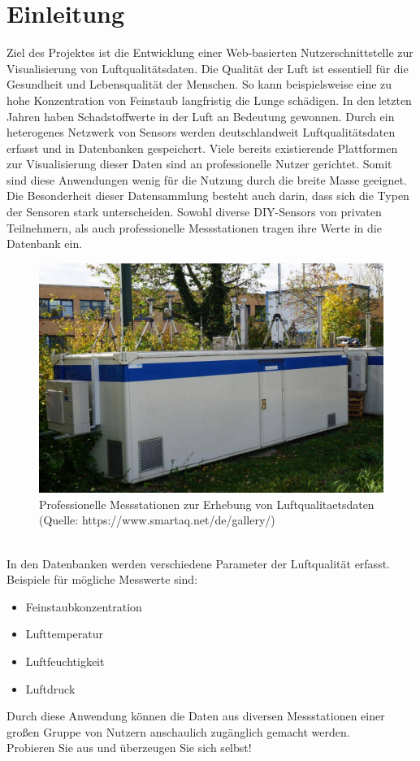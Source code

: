 \section{Einleitung}

Ziel des Projektes ist die Entwicklung einer Web-basierten Nutzerschnittstelle zur Visualisierung von Luftqualitätsdaten.
Die Qualität der Luft ist essentiell für die Gesundheit und Lebensqualität der Menschen. So kann beispielsweise eine zu hohe Konzentration von Feinstaub langfristig die Lunge schädigen. 
In den letzten Jahren haben Schadstoffwerte in der Luft an Bedeutung gewonnen.
Durch ein heterogenes Netzwerk von \glspl{Sensor} werden deutschlandweit Luftqualitätsdaten erfasst und in Datenbanken gespeichert.
Viele bereits existierende Plattformen zur Visualisierung dieser Daten sind an professionelle Nutzer gerichtet. Somit sind diese Anwendungen wenig für die Nutzung durch die breite Masse geeignet.
\\
Die Besonderheit dieser Datensammlung besteht auch darin, dass sich die Typen der Sensoren stark unterscheiden. Sowohl diverse \gls{DIY}-\glspl{Sensor} von privaten Teilnehmern, als auch professionelle Messstationen tragen ihre Werte in die Datenbank ein. 
\\
\begin{figure}[h]
    \centering
    \includegraphics[scale=0.25] {media/Sensor.JPG}
    \caption{Professionelle Messstationen zur Erhebung von \gls{Luftqualitaetsdaten} (Quelle: https://www.smartaq.net/de/gallery/)}
\end{figure}
\\
In den Datenbanken werden verschiedene Parameter der Luftqualität erfasst. Beispiele für mögliche Messwerte sind:
\begin{itemize} [noitemsep]
    \item \gls{Feinstaub}konzentration
    \item Lufttemperatur
    \item Luftfeuchtigkeit
    \item Luftdruck
\end{itemize}
Durch diese Anwendung können die Daten aus diversen Messstationen einer großen Gruppe von Nutzern anschaulich zugänglich gemacht werden.\\
Probieren Sie \softwarename aus und überzeugen Sie sich selbst!